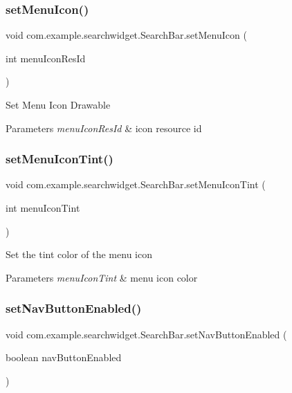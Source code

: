 \subsubsection{\texorpdfstring{setMenuIcon()}{setMenuIcon()}}
{\footnotesize\ttfamily void com.\+example.\+searchwidget.\+Search\+Bar.\+set\+Menu\+Icon (\begin{DoxyParamCaption}\item[{int}]{menu\+Icon\+Res\+Id }\end{DoxyParamCaption})}

Set Menu Icon Drawable


\begin{DoxyParams}{Parameters}
{\em menu\+Icon\+Res\+Id} & icon resource id \\
\hline
\end{DoxyParams}
\mbox{\label{classcom_1_1example_1_1searchwidget_1_1_search_bar_a14d304a30b0065246ea3319c730f2e5c}} 
\subsubsection{\texorpdfstring{setMenuIconTint()}{setMenuIconTint()}}
{\footnotesize\ttfamily void com.\+example.\+searchwidget.\+Search\+Bar.\+set\+Menu\+Icon\+Tint (\begin{DoxyParamCaption}\item[{int}]{menu\+Icon\+Tint }\end{DoxyParamCaption})}

Set the tint color of the menu icon


\begin{DoxyParams}{Parameters}
{\em menu\+Icon\+Tint} & menu icon color \\
\hline
\end{DoxyParams}
\mbox{\label{classcom_1_1example_1_1searchwidget_1_1_search_bar_a4ad3a854a853a3f990f493b053ba8297}} 
\subsubsection{\texorpdfstring{setNavButtonEnabled()}{setNavButtonEnabled()}}
{\footnotesize\ttfamily void com.\+example.\+searchwidget.\+Search\+Bar.\+set\+Nav\+Button\+Enabled (\begin{DoxyParamCaption}\item[{boolean}]{nav\+Button\+Enabled }\end{DoxyParamCaption})}

